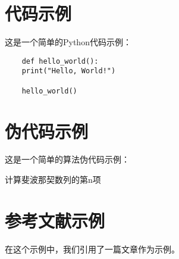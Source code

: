 \documentclass{Krep}
\begin{document}
\section{代码示例}

这是一个简单的Python代码示例：

\begin{verbatim}
    def hello_world():
    print("Hello, World!")
    
    hello_world()
\end{verbatim}

\section{伪代码示例}
这是一个简单的算法伪代码示例：

\begin{algorithm}[H]
	\caption{计算斐波那契数列的第n项}
\end{algorithm}
\section{参考文献示例}

在这个示例中，我们引用了一篇文章\cite{ref1}作为示例。

\printbibliography
\end{document}
